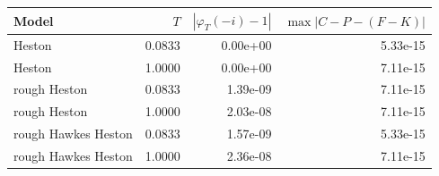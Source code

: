 \begin{tabular}{lrrr}
\toprule
Model & $T$ & $|\varphi_T(-i)-1|$ & $\max|C-P-(F-K)|$\\
\midrule
Heston & 0.0833 & 0.00e+00 & 5.33e-15\\
Heston & 1.0000 & 0.00e+00 & 7.11e-15\\
rough Heston & 0.0833 & 1.39e-09 & 7.11e-15\\
rough Heston & 1.0000 & 2.03e-08 & 7.11e-15\\
rough Hawkes Heston & 0.0833 & 1.57e-09 & 5.33e-15\\
rough Hawkes Heston & 1.0000 & 2.36e-08 & 7.11e-15\\
\bottomrule
\end{tabular}
